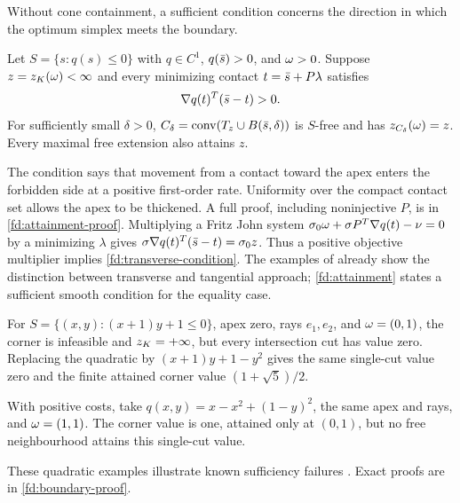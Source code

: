 Without cone containment, a sufficient condition concerns the direction
in which the optimum simplex meets the boundary.
\begin{theorem}\label{fd:attainment}
Let $S=\{s:q(s)\le0\}$ with $q\in C^1$, $q(\bar s)>0$, and $\omega>0$.
Suppose $z=z_K(\omega)<\infty$ and every minimizing contact
$t=\bar s+P\lambda$ satisfies
\begin{equation}\label{fd:transverse-condition}
 \nabla q(t)^T(\bar s-t)>0.
\end{equation}
For sufficiently small $\delta>0$,
$C_\delta=\operatorname{conv}(T_z\cup B(\bar s,\delta))$ is $S$-free and has
$z_{C_\delta}(\omega)=z$. Every maximal free extension also attains $z$.
\end{theorem}
The condition says that movement from a contact toward the apex enters
the forbidden side at a positive first-order rate. Uniformity over the
compact contact set allows the apex to be thickened. A full proof,
including noninjective $P$, is in \cref{fd:attainment-proof}.
Multiplying a Fritz John system
$\sigma_0\omega+\sigma P^T\nabla q(t)-\nu=0$ by a minimizing $\lambda$
gives
$\sigma\nabla q(t)^T(\bar s-t)=\sigma_0z$.
Thus a positive objective multiplier implies \cref{fd:transverse-condition}.
The examples of \citet{KKYang2017} already show the distinction between
transverse and tangential approach; \cref{fd:attainment} states a
sufficient smooth condition for the equality case.

\begin{example}\label{fd:boundary-examples}
For $S=\{(x,y):(x+1)y+1\le0\}$, apex zero, rays $e_1,e_2$, and
$\omega=(0,1)$, the corner is infeasible and $z_K=+\infty$, but every
intersection cut has value zero. Replacing the quadratic by
$(x+1)y+1-y^2$ gives the same single-cut value zero and the finite attained
corner value $(1+\sqrt5)/2$.

With positive costs, take
$q(x,y)=x-x^2+(1-y)^2$, the same apex and rays, and $\omega=(1,1)$.
The corner value is one, attained only at $(0,1)$, but no free
neighbourhood attains this single-cut value.
\end{example}
These quadratic examples illustrate known sufficiency failures
\citep{CCDLM2015,KKYang2017}. Exact proofs are in
\cref{fd:boundary-proof}.

